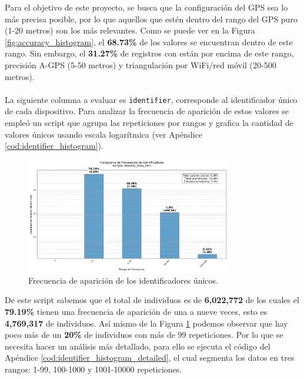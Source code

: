 Para el objetivo de este proyecto, se busca que la configuración del GPS sea lo más precisa posible, por lo que aquellos que estén dentro del rango del GPS puro (1-20 metros) son los más relevantes. Como se puede ver en la Figura \ref{fig:accuracy_histogram}, el \textbf{68.73\%} de los valores se encuentran dentro de este rango. Sin embargo, el \textbf{31.27\%} de registros con están por encima de este rango, precisión A-GPS (5-50 metros) y triangulación por WiFi/red móvil (20-500 metros).\\
\\
La siguiente columna a evaluar es \texttt{identifier}, corresponde al identificador único de cada dispositivo.  Para analizar la frecuencia de aparición de estos valores se empleó un script que agrupa las repeticiones por rangos y grafica la cantidad de valores únicos usando escala logarítmica (ver Apéndice \ref{cod:identifier_histogram}).

\begin{figure}[H]
    \centering
    \includegraphics[width=0.8\textwidth]{img/histograma_identifier_Mobility_Data_Slim.png}
    \caption{Frecuencia de aparición de los identificadores únicos.}
    \label{fig:identifier_histogram}
\end{figure}

 De este script sabemos que el total de individuos es de \textbf{6,022,772} de los cuales el \textbf{79.19\%} tienen una frecuencia de aparición de una a nueve veces, esto es \textbf{4,769,317} de individuos. Así mismo de la Figura \ref{fig:identifier_histogram} podemos observar que hay poco más de un \textbf{20\%} de individuos con más de 99 repeticiones. Por lo que se necesita hacer un análisis más detallado, para ello se ejecuta el código del Apéndice \ref{cod:identifier_histogram_detailed}, el cual segmenta los datos en tres rangos: 1-99, 100-1000 y 1001-10000 repeticiones.

